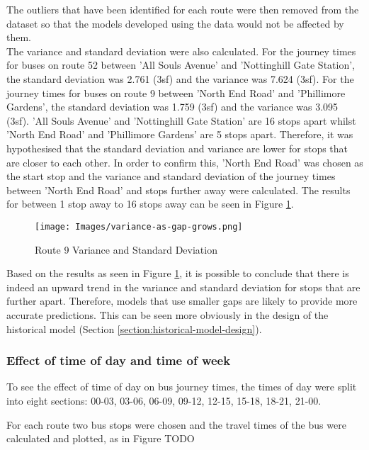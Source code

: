 The outliers that have been identified for each route were then removed from the dataset so that the models developed using the data would not be affected by them. \\

The variance and standard deviation were also calculated. For the journey times for buses on route 52 between 'All Souls Avenue' and 'Nottinghill Gate Station', the standard deviation was 2.761 (3sf) and the variance was 7.624 (3sf). For the journey times for buses on route 9 between 'North End Road' and 'Phillimore Gardens', the standard deviation was 1.759 (3sf) and the variance was 3.095 (3sf). 'All Souls Avenue' and 'Nottinghill Gate Station' are 16 stops apart whilst 'North End Road' and 'Phillimore Gardens' are 5 stops apart. Therefore, it was hypothesised that the standard deviation and variance are lower for stops that are closer to each other. In order to confirm this, 'North End Road' was chosen as the start stop and the variance and standard deviation of the journey times between 'North End Road' and stops further away were calculated. The results for between 1 stop away to 16 stops away can be seen in Figure \ref{fig:variance-sd-9}.

\begin{figure}[H]
\begin{center}
    \texttt{[image: Images/variance-as-gap-grows.png]}
    \caption{Route 9 Variance and Standard Deviation}
    \label{fig:variance-sd-9}
\end{center}
\end{figure}

Based on the results as seen in Figure \ref{fig:variance-sd-9}, it is possible to conclude that there is indeed an upward trend in the variance and standard deviation for stops that are further apart. Therefore, models that use smaller gaps are likely to provide more accurate predictions. This can be seen more obviously in the design of the historical model (Section \ref{section:historical-model-design}). 

\subsubsection{Effect of time of day and time of week}

To see the effect of time of day on bus journey times, the times of day were split into eight sections: 00-03, 03-06, 06-09, 09-12, 12-15, 15-18, 18-21, 21-00. 

For each route two bus stops were chosen and the travel times of the bus were calculated and plotted, as in Figure TODO

